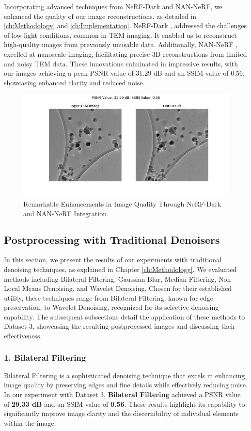 Incorporating advanced techniques from NeRF-Dark and NAN-NeRF, we enhanced the quality of our image reconstructions, as detailed in \ref{ch:Methodology} and \ref{ch:Implementation}. NeRF-Dark \cite{Mildenhall2021}, addressed the challenges of low-light conditions, common in TEM imaging. It enabled us to reconstruct high-quality images from previously unusable data. Additionally, NAN-NeRF \cite{Pearl2022}, excelled at nanoscale imaging, facilitating precise 3D reconstructions from limited and noisy TEM data. These innovations culminated in impressive results, with our images achieving a peak PSNR value of 31.29 dB and an SSIM value of 0.56, showcasing enhanced clarity and reduced noise.
\begin{figure}[H]
    \centering
    \includegraphics[width=.9\textwidth]{img/Dataset_3_with_Nerf_inthe_dark.jpg}
    \caption{Remarkable Enhancements in Image Quality Through NeRF-Dark and NAN-NeRF Integration.}\label{fig:Dataset_3_Nerf_inthe_dark.jpg}
\end{figure}

\subsection{Postprocessing with Traditional Denoisers}
In this section, we present the results of our experiments with traditional denoising techniques, as explained in Chapter \ref{ch:Methodology}. We evaluated methods including Bilateral Filtering, Gaussian Blur, Median Filtering, Non-Local Means Denoising, and Wavelet Denoising. Chosen for their established utility, these techniques range from Bilateral Filtering, known for edge preservation, to Wavelet Denoising, recognized for its selective denoising capability. The subsequent subsections detail the application of these methods to Dataset 3, showcasing the resulting postprocessed images and discussing their effectiveness.

\subsubsection{1. Bilateral Filtering}
Bilateral Filtering is a sophisticated denoising technique that excels in enhancing image quality by preserving edges and fine details while effectively reducing noise. In our experiment with Dataset 3, \textbf{Bilateral Filtering} achieved a PSNR value of \textbf{29.33 dB} and an SSIM value of \textbf{0.56}. These results highlight its capability to significantly improve image clarity and the discernibility of individual elements within the image.

